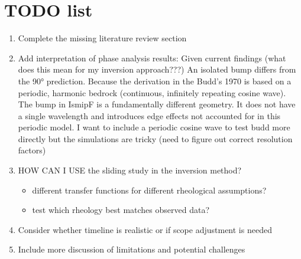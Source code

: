 \chapter{TODO list}

\begin{enumerate}
\item Complete the missing literature review section

\item Add interpretation of phase analysis results: 
Given current findings (what does this mean for my inversion approach???)
    An isolated bump differs from the 90° prediction. Because the derivation in the Budd's 1970 is based on a periodic, harmonic bedrock (continuous, infinitely repeating cosine wave). The bump in IsmipF is a fundamentally different geometry. It does not have a single wavelength and introduces edge effects not accounted for in this periodic model.
    I want to include a periodic cosine wave to test budd more directly but the simulations are tricky (need to figure out correct resolution factors)

\item HOW CAN I USE the sliding study in the inversion method?
    \begin{itemize}
       \item different transfer functions for different rheological assumptions? 
       \item test which rheology best matches observed data?
    \end{itemize}

\item Consider whether timeline is realistic or if scope adjustment is needed

\item Include more discussion of limitations and potential challenges
\end{enumerate}


